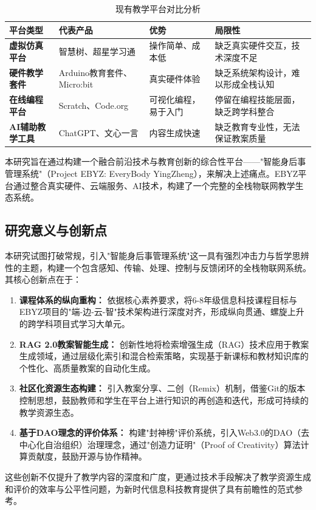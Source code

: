 \documentclass[12pt,a4paper,fontset=fandol]{ctexart}
\begin{document}
\begin{table}[H]
    \centering
    \caption{现有教学平台对比分析}
    \label{tab:platform-comparison}
    \begin{tabular}{p{2.5cm}p{3cm}p{3cm}p{3cm}}
        \toprule
        \textbf{平台类型} & \textbf{代表产品} & \textbf{优势} & \textbf{局限性} \\
        \midrule
        \textbf{虚拟仿真平台} & 智慧树、超星学习通 & 操作简单、成本低 & 缺乏真实硬件交互，技术深度不足 \\
        \midrule
        \textbf{硬件教学套件} & Arduino教育套件、Micro:bit & 真实硬件体验 & 缺乏系统架构设计，难以形成全栈认知 \\
        \midrule
        \textbf{在线编程平台} & Scratch、Code.org & 可视化编程，易于入门 & 停留在编程技能层面，缺乏跨学科整合 \\
        \midrule
        \textbf{AI辅助教学工具} & ChatGPT、文心一言 & 内容生成快速 & 缺乏教育专业性，无法保证教案质量 \\
        \bottomrule
    \end{tabular}
\end{table}

本研究旨在通过构建一个融合前沿技术与教育创新的综合性平台——"智能身后事管理系统"（Project EBYZ: EveryBody YingZheng），来解决上述痛点。EBYZ平台通过整合真实硬件、云端服务、AI技术，构建了一个完整的全栈物联网教学生态系统。

\subsection{研究意义与创新点}
本研究试图打破常规，引入"智能身后事管理系统"这一具有强烈冲击力与哲学思辨性的主题，构建一个包含感知、传输、处理、控制与反馈闭环的全栈物联网系统。其核心创新点在于：
\begin{enumerate}[label=(\roman*)]
    \item \textbf{课程体系的纵向重构：} 依据核心素养要求，将6-8年级信息科技课程目标与EBYZ项目的"端-边-云-智"技术架构进行深度对齐，形成纵向贯通、螺旋上升的跨学科项目式学习大单元。
    \item \textbf{RAG 2.0教案智能生成：} 创新性地将检索增强生成（RAG）技术应用于教案生成领域，通过层级化索引和混合检索策略，实现基于新课标和教材知识库的个性化、高质量教案的自动化生成。
    \item \textbf{社区化资源生态构建：} 引入教案分享、二创（Remix）机制，借鉴Git的版本控制思想，鼓励教师和学生在平台上进行知识的再创造和迭代，形成可持续的教学资源生态。
    \item \textbf{基于DAO理念的评价体系：} 构建"封神榜"评价系统，引入Web3.0的DAO（去中心化自治组织）治理理念，通过"创造力证明"（Proof of Creativity）算法计算贡献度，鼓励开源与协作精神。
\end{enumerate}
这些创新不仅提升了教学内容的深度和广度，更通过技术手段解决了教学资源生成和评价的效率与公平性问题，为新时代信息科技教育提供了具有前瞻性的范式参考。
\end{document}
